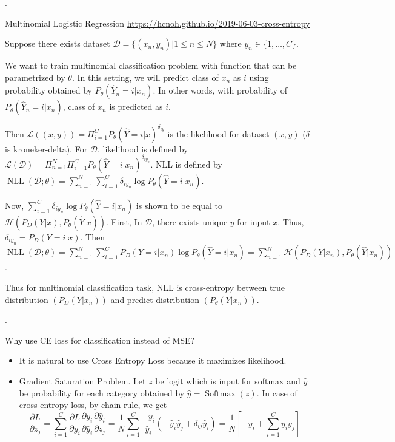 \documentclass[8pt]{beamer}
\newcommand{\mc}[1]{\mathcal{#1}}
\newcommand{\NLL}[1]{\operatorname{NLL}\!\left(#1\right)}
\newcommand{\Softmax}[1]{\operatorname{Softmax}\!\left(#1\right)}
\begin{document}
\begin{frame}{.}
  \begin{block}{Multinomial Logistic Regression}
    \href{https://hcnoh.github.io/2019-06-03-cross-entropy}{https://hcnoh.github.io/2019-06-03-cross-entropy}
    \smallskip

    Suppose there exists dataset $\mc{D} = \{(x_n,y_n)| 1\leq n \leq N\}$ where $y_n \in \{1, \dots, C\}$.

    We want to train multinomial classification problem with function that can be parametrized by $\theta$. 
    In this setting, we will predict class of $x_n$ as $i$ using probability obtained by $P_\theta (\hat{Y}_n = i|x_n)$. 
    In other words, with probability of $P_\theta (\hat{Y}_n = i |x_n)$, class of $x_n$ is predicted as $i$.

    \smallskip
    Then $\mc{L}((x,y)) = \Pi_{i=1}^C P_\theta(\hat{Y}=i|x)^{\delta_{iy}}$ is the likelihood for dataset $(x,y)$ ($\delta$ is kroneker-delta).
    For $\mc{D}$, likelihood is defined by $\mc{L}(\mc{D}) = \Pi_{n=1}^N \Pi_{i=1}^C P_\theta(\hat{Y}=i|x_n)^{\delta_{iy_n}}$. NLL is defined by $\NLL{\mc{D};\theta} = \sum_{n=1}^N \sum_{i=1}^C \delta_{i y_n} \log{P_\theta (\hat{Y}=i | x_n)}$.

    \smallskip
    Now, $\sum_{i=1}^C \delta_{i y_n} \log{P_\theta(\hat{Y}=i| x_n)}$ is shown to be equal to $\mc{H}( P_D(Y|x), P_\theta(\hat{Y}|x))$. First, In $\mc{D}$, there exists unique $y$ for input $x$. Thus, $\delta_{iy_n} = P_D(Y=i|x)$. Then $\NLL{\mc{D};\theta} = \sum_{n=1}^N \sum_{i=1}^C P_D(Y=i| x_n) \log{P_\theta (\hat{Y}=i|x_n)} = \sum_{n=1}^N\mc{H}(P_D(Y|x_n), P_\theta (\hat{Y}|x_n))$.

    \bigskip
    Thus for multinomial classification task, NLL is cross-entropy between true distribution $(P_D(Y|x_n))$ and predict distribution $(P_\theta(Y|x_n))$.

  \end{block}
\end{frame}

\begin{frame}{.}
  \begin{block}{Why use CE loss for classification instead of MSE?}
    \begin{itemize}
      \item It is natural to use  Cross Entropy Loss because it maximizes likelihood.
      \item Gradient Saturation Problem.
      Let $z$ be logit which is input for softmax and $\hat{y}$ be probability for each category obtained by $\hat{y} = \Softmax{z}$. In case of cross entropy loss, by chain-rule, we get \[\frac{\partial L}{\partial z_j} = \sum_{i=1}^C \frac{\partial L}{\partial y_i}\frac{\partial y_i}{\partial \hat{y}_i}\frac{\partial \hat{y}_i}{\partial z_j} = \frac{1}{N}\sum_{i=1}^C \frac{-y_i}{\hat{y}_i} (-\hat{y}_i \hat{y}_j + \delta_{ij} \hat{y}_i) = \frac{1}{N} \left[-y_i + \sum_{i=1}^C y_i y_j\right]\]
    \end{itemize}
  
  \end{block}
\end{frame}
\end{document}
